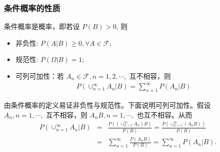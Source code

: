 \begin{frame}
	\frametitle{条件概率的性质}
	\begin{thm}
		条件概率是概率，即若设 $P(B)>0$, 则
		\begin{itemize}[<+-|alert@+>]
			\item 非负性: $P (A|B)\geq 0, \forall A\in\mathcal{F}$;
			\item 规范性: $P (\Omega|B)=1$;
			\item 可列可加性：若 $A_n\in \mathcal{F}, n=1,2,\cdots,$ 互不相容，则
			\begin{eqnarray*}
				P(\cup_{n=1}^\infty A_n|B)=\sum_{n=1}^\infty P(A_n|B)
			\end{eqnarray*}

		\end{itemize}
	\end{thm}

	\pause \zheng 由条件概率的定义易证非负性与规范性。下面说明可列可加性。假设 $A_n,n=1,\cdots,$ 互不相容，则 $A_nB, n=1,\cdots,$ 也互不相容。从而
	\begin{eqnarray*}
		P(\cup_{n=1}^\infty A_n|B)&=&\frac{P((\cup_{n=1}^\infty A_n)B)}{P(B)}=\frac{P(\cup_{n=1}^\infty (A_nB))}{P(B)}\\
		&=&\sum_{n=1}^\infty \frac{P(A_nB)}{P(B)}=\sum_{n=1}^\infty P(A_n|B).
	\end{eqnarray*}
\end{frame}


